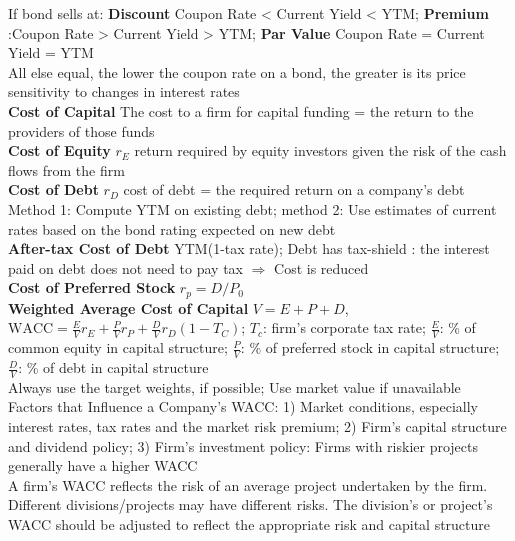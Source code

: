 \documentclass[12pt,landscape, a4paper]{article}
\theoremstyle{remark}
\begin{document}
\begin{multicols*}{3}
If bond sells at: \textbf{Discount} Coupon Rate < Current Yield < YTM; \textbf{Premium} :Coupon Rate > Current Yield > YTM; \textbf{Par Value} Coupon Rate = Current Yield = YTM\\
All else equal, the lower the coupon rate on a bond, the greater is its price sensitivity to changes in interest rates\\

\textbf{Cost of Capital} The cost to a firm for capital funding = the return to the providers of those funds\\
\textbf{Cost of Equity} $r_E$ return required by equity investors given the risk of the cash flows from the firm\\
\textbf{Cost of Debt} $r_D$ cost of debt = the required return on a 
company’s debt
Method 1: Compute YTM on existing debt; method 2: Use estimates of current rates based on the bond rating expected on new debt\\
\textbf{After-tax Cost of Debt} YTM(1-tax rate);
Debt has tax-shield : the interest paid on debt does not need to pay tax $\Rightarrow$ Cost is reduced\\
\textbf{Cost of Preferred Stock} $r_p = D / P_0$\\
\textbf{Weighted Average Cost of Capital} $V = E+P+D$, $\mathrm{WACC} = \frac{E}{V}r_E + \frac{P}{V}r_P + \frac{D}{V} r_D (1 - T_C)$; $T_c$: firm's 
corporate tax rate; $\frac{E}{V}$: \% of common equity in capital structure; $\frac{P}{V}$: \% of preferred stock in capital structure; $\frac{D}{V}$: \% of debt in capital structure\\
Always use the target weights, if possible; Use market value if unavailable\\
Factors that Influence a Company’s WACC: 1) Market conditions, especially interest rates, tax rates and the market risk premium; 2) Firm’s capital structure and dividend policy; 3) Firm's investment policy: Firms with riskier projects generally have a higher WACC\\
A firm’s WACC reflects the risk of an average project undertaken by the firm. Different divisions/projects may have different risks. The division’s or project’s WACC should be adjusted to reflect the appropriate risk and capital structure\\


\end{multicols*}
\end{document}
